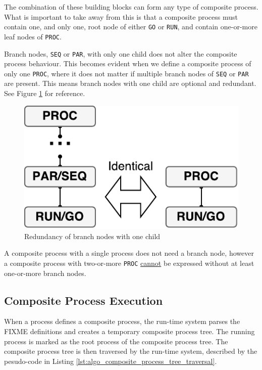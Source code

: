 \FloatBarrier

The combination of these building blocks can form any type of composite process. What is important to take away from this is that a composite process must \underline{} contain one, and only one, root node of either \texttt{GO} or \texttt{RUN}, and \underline{} contain one\hyp{}or\hyp{}more leaf nodes of \texttt{PROC}. 

Branch nodes, \texttt{SEQ} or \texttt{PAR}, with only one child does not alter the composite process behaviour. This becomes evident when we define a composite process of only one \texttt{PROC}, where it does not matter if multiple branch nodes of \texttt{SEQ} or \texttt{PAR} are present. This means branch nodes with one child are optional and redundant. See Figure \ref{fig:composite_axiom} for reference. 

\FloatBarrier

\begin{figure}[h]
    \centering
    \includegraphics[width=0.5\linewidth]{fig/composite_axiom}
    \caption{Redundancy of branch nodes with one child}
    \label{fig:composite_axiom}
\end{figure}

\FloatBarrier

A composite process with a single process does not need a branch node, however a composite process with two\hyp{}or\hyp{}more \texttt{PROC} \underline{cannot} be expressed without at least one\hyp{}or\hyp{}more branch nodes.

\subsection{Composite Process Execution}

When a process defines a composite process, the run\hyp{}time system parses the FIXME definitions and creates a temporary composite process tree. The running process is marked as the root process of the composite process tree. The composite process tree is then traversed by the run\hyp{}time system, described by the pesudo\hyp{}code in Listing \ref{lst:algo_composite_process_tree_traversal}.

